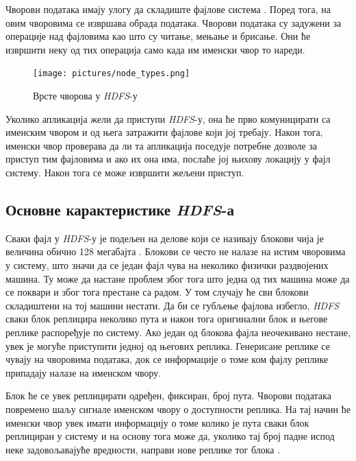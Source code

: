 \documentclass[12pt,oneside]{memoir}
\begin{document}
Чворови података имају улогу да складиште фајлове система \cite{hadoop_arch_guide}. Поред тога, на овим чворовима се извршава обрада података. Чворови података су задужени за операције над фајловима као што су читање, мењање и брисање. Они ће извршити неку од тих операција само када им именски чвор то нареди.

\begin{figure}[!ht]
  \centering
  \texttt{[image: pictures/node\_types.png]}
  \caption{Врсте чворова у \textit{HDFS}-у}
  \label{fig:hadoop_nodovi}
\end{figure}

Уколико апликација жели да приступи \textit{HDFS}-у, она ће прво комуницирати са именским чвором и од њега затражити фајлове који јој требају. Након тога, именски чвор проверава да ли та апликација поседује потребне дозволе за приступ тим фајловима и ако их она има, послаће јој њихову локацију у фајл систему. Након тога се може извршити жељени приступ. 

\subsection{Основне карактеристике \textit{HDFS}-а}
\label{subsec:hdfs_osobine}

Сваки фајл у \textit{HDFS}-у је подељен на делове који се називају блокови чија је величина обично 128 мегабајта \cite{hadoop_arch_guide}. Блокови се често не налазе на истим чворовима у систему, што значи да се један фајл чува на неколико физички раздвојених машина. Ту може да настане проблем због тога што једна од тих машина може да се поквари и због тога престане са радом. У том случају ће сви блокови складиштени на тој машини нестати. Да би се губљење фајлова избегло, \textit{HDFS} сваки блок реплицира неколико пута и након тога оригинални блок и његове реплике распоређује по систему. Ако један од блокова фајла неочекивано нестане, увек је могуће приступити једној од његових реплика. Генерисане реплике се чувају на чворовима података, док се информације о томе ком фајлу реплике припадају налазе на именском чвору.

Блок ће се увек реплицирати одређен, фиксиран, број пута. Чворови података повремено шаљу сигнале именском чвору о доступности реплика. На тај начин ће именски чвор увек имати информацију о томе колико је пута сваки блок реплициран у систему и на основу тога може да, уколико тај број падне испод неке задовољавајуће вредности, направи нове реплике тог блока \cite{hadoop_arch_guide}.
\end{document}

